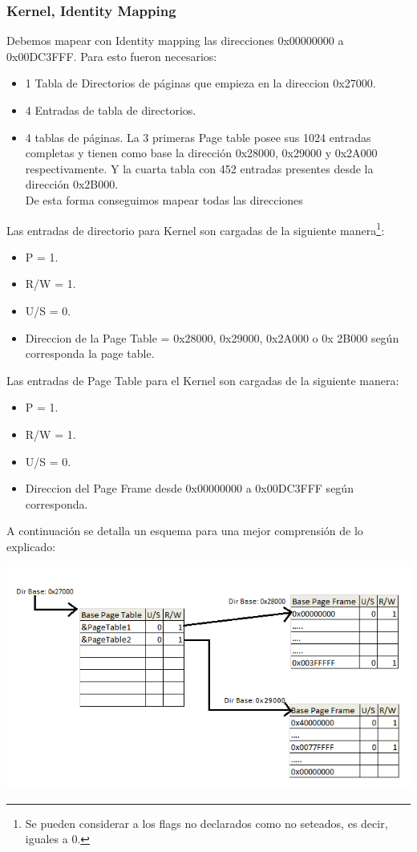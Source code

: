 \subsubsection{Kernel, Identity Mapping}
Debemos mapear con Identity mapping las direcciones 0x00000000 a 0x00DC3FFF. Para esto fueron necesarios:

\begin{itemize}
 \item 1 Tabla de Directorios de p\'aginas que empieza en la direccion 0x27000.
 \item 4 Entradas de tabla de directorios. 
 \item 4 tablas de p\'aginas. La 3 primeras Page table posee sus 1024 entradas completas  
y tienen como base la direcci\'on 0x28000, 0x29000 y 0x2A000 respectivamente. Y la cuarta tabla con 452 entradas presentes desde la dirección 0x2B000. \\
De esta forma conseguimos mapear todas las direcciones
\end{itemize}

Las entradas de directorio para Kernel son cargadas de la siguiente manera\footnote{Se pueden considerar a los flags no declarados como
no seteados, es decir, iguales a 0.}:
\begin{itemize}
 \item P = 1.
 \item R/W = 1.
 \item U/S = 0.
 \item Direccion de la Page Table = 0x28000, 0x29000, 0x2A000 o 0x 2B000 seg\'un corresponda la  page table.
\end{itemize}

Las entradas de Page Table para el Kernel son cargadas de la siguiente manera\footnotemark[3]:
\begin{itemize}
 \item P = 1.
 \item R/W = 1.
 \item U/S = 0.
 \item Direccion del Page Frame desde 0x00000000 a 0x00DC3FFF seg\'un corresponda.
\end{itemize}

A continuaci\'on se detalla un esquema para una mejor comprensi\'on de lo explicado:

\includegraphics[scale=0.6]{imagenes/tablasDePaginasEj3.png}

